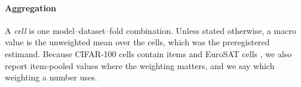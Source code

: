 \paragraph{Aggregation}
A \emph{cell} is one model--dataset--fold combination. Unless stated otherwise,
a macro value is the unweighted mean over the \ExpCells{} cells, which was the
preregistered estimand. Because CIFAR-100 cells contain
\ExpCifarItemsPerCell{} items and EuroSAT cells \ExpEurosatItemsPerCell{}, we
also report item-pooled values where the weighting matters, and we say which
weighting a number uses.
